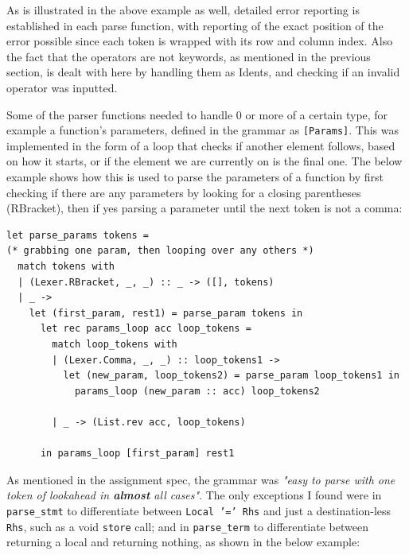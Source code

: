 \documentclass[11pt, a4paper]{article}
\begin{document}
\medskip

As is illustrated in the above example as well, detailed error reporting is established in each parse function, with reporting of the exact position of the error 
possible since each token is wrapped with its row and column index. Also the fact that the operators are not keywords, as mentioned in the previous section, is 
dealt with here by handling them as Idents, and checking if an invalid operator was inputted.

\medskip

Some of the parser functions needed to handle 0 or more of a certain type, for example a function's parameters, defined in the grammar as \texttt{[Params]}. This was implemented in the form of a 
loop that checks if another element follows, based on how it starts, or if the element we are currently on is the final one. The below example shows how 
this is used to parse the parameters of a function by first checking if there are any parameters by looking for a closing parentheses (RBracket),
then if yes parsing a parameter until the next token is not a comma:

\medskip

\begin{lstlisting}[language={[Objective]Caml}]
let parse_params tokens = 
(* grabbing one param, then looping over any others *)
  match tokens with 
  | (Lexer.RBracket, _, _) :: _ -> ([], tokens)
  | _ ->
    let (first_param, rest1) = parse_param tokens in
      let rec params_loop acc loop_tokens =
        match loop_tokens with
        | (Lexer.Comma, _, _) :: loop_tokens1 ->
          let (new_param, loop_tokens2) = parse_param loop_tokens1 in
            params_loop (new_param :: acc) loop_tokens2
            
        | _ -> (List.rev acc, loop_tokens)

      in params_loop [first_param] rest1
\end{lstlisting}

\medskip

As mentioned in the assignment spec, the grammar was \textit{"easy to parse with one token of lookahead in \textbf{almost} all cases"}. The only exceptions I found were in \texttt{parse\_stmt} to
differentiate between \texttt{Local '=' Rhs} and just a destination-less \texttt{Rhs}, such as a void \texttt{store} call; and in \texttt{parse\_term} to differentiate between returning a local and
returning nothing, as shown in the below example:

\medskip
\end{document}
